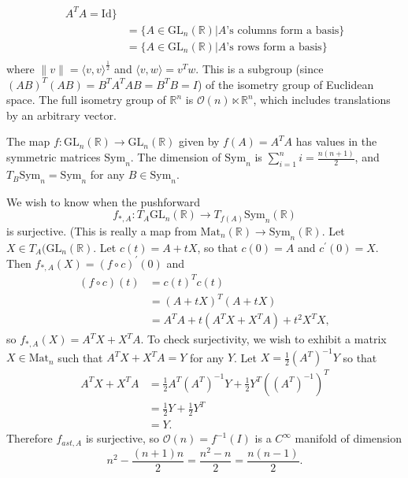 \begin{xmpl}
\begin{enumerate}
{\begin{align*}
            A^T A = \mathrm{Id}
         \} \\
      &= \{ A \in \mathrm{GL}_n(\mathbb{R}) \vert
            \text{$A$'s columns form a basis}
         \} \\
      &= \{ A \in \mathrm{GL}_n(\mathbb{R}) \vert
            \text{$A$'s rows form a basis}
         \} \\
      \end{align*}
      where $\|v\| = \langle v, v \rangle^{\frac{1}{2}}$ and
      $\langle v, w \rangle = v^T w$. This is a subgroup (since
      $(AB)^T(AB) = B^T A^T A B = B^T B = I$) of the
      isometry group of Euclidean space.
      The full isometry group of $\mathbb{R}^n$ is
      $\mathcal{O}(n) \ltimes \mathbb{R}^n$, which includes
      translations by an arbitrary vector.

      The map $f: \mathrm{GL}_n(\mathbb{R}) \to
      \mathrm{GL}_n(\mathbb{R})$ given by $f(A) = A^T A$ has values in
      the symmetric matrices $\mathrm{Sym}_n$. The dimension of
      $\mathrm{Sym}_n$ is $\sum_{i=1}^n i = \frac{n(n+1)}{2}$, and
      $T_B \mathrm{Sym}_n = \mathrm{Sym}_n$ for any $B \in
      \mathrm{Sym}_n$.

      We wish to know when the pushforward
      $$
        f_{\ast, A} :
            T_A \mathrm{GL}_n(\mathbb{R})
        \to T_{f(A)} \mathrm{Sym}_n(\mathbb{R})
      $$
      is surjective. (This is really a map from
      $\mathrm{Mat}_n(\mathbb{R}) \to \mathrm{Sym}_n(\mathbb{R})$.
      Let $X \in T_A(\mathrm{GL}_n(\mathbb{R})$. Let
      $c(t) = A + tX$, so that $c(0) = A$ and $c^\prime(0) = X$. Then
      $f_{\ast, A}(X) = (f \circ c)^\prime(0)$ and
      \begin{align*}
         (f \circ c)(t)
      &= c(t)^T c(t) \\
      &= (A + tX)^T(A + tX) \\
      &= A^TA + t(A^T X + X^T A) + t^2 X^T X,
      \end{align*}
      so $f_{\ast, A}(X) = A^T X + X^T A$. To check surjectivity, we
      wish to exhibit a matrix $X \in \mathrm{Mat}_n$ such that
      $A^T X + X^T A = Y$ for any $Y$. Let
      $X = \frac{1}{2} (A^T)^{-1} Y$ so that
      \begin{align*}
         A^T X + X^T A
      &= \frac{1}{2}
           A^T (A^T)^{-1} Y
       + \frac{1}{2}
           Y^T((A^T)^{-1})^T \\
      &= \frac{1}{2} Y + \frac{1}{2} Y^T \\
      &= Y.
      \end{align*}
      Therefore $f_{ast, A}$ is surjective, so
      $\mathcal{O}(n) = f^{-1}(I)$ is a $C^\infty$ manifold of
      dimension
      $$
        n^2 - \frac{(n+1)n}{2}
      = \frac{n^2 - n}{2}
      = \frac{n(n-1)}{2}.
      $$

}
\end{enumerate}
\end{xmpl}
